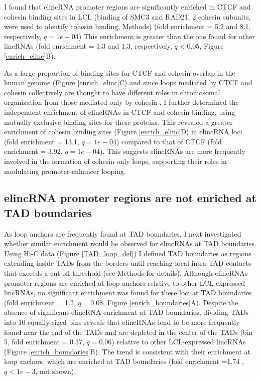 \documentclass[11pt,a4paper]{report}
\begin{document}
I found that elincRNA promoter regions are significantly enriched in CTCF and cohesin binding sites in LCL (binding of SMC3 and RAD21, 2 cohesin subunits, were used to identify cohesin binding, Methods) (fold enrichment = 5.2 and 8.1, respectively, $q=1e-04$) This enrichment is greater than the one found for other lincRNAs (fold enrichment = 1.3 and 1.3, respectively, $q<0.05$, Figure \ref{enrich_elinc}B).

As a large proportion of binding sites for CTCF and cohesin overlap in the human genome (Figure \ref{enrich_elinc}C) and since loops mediated by CTCF and cohesin collectively are thought to have different roles in chromosomal organization from those mediated only by cohesin \cite{Ji2016}⁠, I further determined the independent enrichment of elincRNAs in CTCF and cohesin binding, using mutually exclusive binding sites for these proteins. This revealed a greater enrichment of cohesin binding sites (Figure \ref{enrich_elinc}D) in elincRNA loci (fold enrichment = 13.1, $q=1e-04$) compared to that of CTCF (fold enrichment = 3.92, $q=1e-04$). This suggests elincRNAs are more frequently involved in the formation of cohesin-only loops, supporting their roles in modulating promoter-enhancer looping.

\subsection*{elincRNA promoter regions are not enriched at TAD boundaries}

As loop anchors are frequently found at TAD boundaries, I next investigated whether similar enrichment would be observed for elincRNAs at TAD boundaries. Using Hi-C data (Figure \ref{TAD_loop_def}) I defined TAD boundaries as regions extending inside TADs from the borders until reaching local intra-TAD contacts that exceeds a cut-off threshold (see Methods for details). Although elincRNAs promoter regions are enriched at loop anchors relative to other LCL-expressed lincRNAs, no significant enrichment was found for these loci  at TAD boundaries (fold enrichment = 1.2, $q=0.08$, Figure \ref{enrich_boundaries}A). Despite the absence of significant elincRNA enrichment at TAD boundaries, dividing TADs into 10 equally sized bins reveals that elincRNAs tend to be more frequently found near the end of the TADs and are depleted in the center of the TADs (bin 5, fold enrichment = 0.37, $q=0.06$) relative to other LCL-expressed lincRNAs (Figure \ref{enrich_boundaries}B). The trend is consistent with their enrichment at loop anchors, which are enriched at TAD boundaries (fold enrichment =1.74 , $q<1e-3$, not shown).
\end{document}
